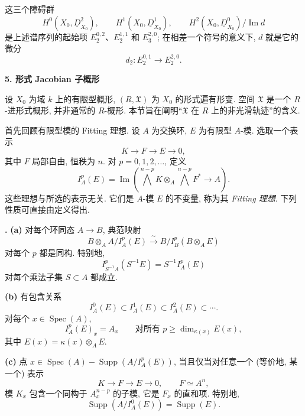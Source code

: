 
这三个障碍群
\[
H^0(X_0,\underline D^2_{X_0}),
\qquad
H^1(X_0,\underline D^1_{X_0}),
\qquad
H^2(X_0,\underline D^0_{X_0})/\operatorname{Im}d
\]
是上述谱序列的起始项 $E_2^{0,2}$、$E_2^{1,1}$ 和 $E_3^{2,0}$; 在相差一个符号的意义下, $d$ 就是它的微分
\[
d_2:E_2^{0,1}\longrightarrow E_2^{2,0}.
\]



\bigskip
\noindent\textbf{5. 形式 Jacobian 子概形}

\medskip
设 $X_0$ 为域 $k$ 上的有限型概形, $(R,\mathfrak X)$ 为 $X_0$ 的形式遍有形变. 空间 $\mathfrak X$ 是一个 $R$-进形式概形, 并非通常的 $R$-概形. 本节旨在阐明“$\mathfrak X$ 在 $R$ 上的非光滑轨迹”的含义.

首先回顾有限型模的 Fitting 理想. 设 $A$ 为交换环, $E$ 为有限型 $A$-模. 选取一个表示
\[
K\longrightarrow F\longrightarrow E\longrightarrow0,
\]
其中 $F$ 局部自由, 恒秩为 $n$. 对 $p=0,1,2,\ldots$, 定义
\[
I_A^p(E)=\operatorname{Im}\left(
 \bigwedge^{n-p}K\otimes_A\bigwedge^{n-p}F^*
 \longrightarrow A\right).
\]
这些理想与所选的表示无关. 它们是 $A$-模 $E$ 的不变量, 称为其 \emph{Fitting 理想}. 下列性质可直接由定义得出.

\medskip
\noindent\textbf{.}
\textbf{(a)} 对每个环同态 $A\longrightarrow B$, 典范映射
\[
B\otimes_A A/I_A^p(E)
\xrightarrow{\ \sim\ }
B/I_B^p(B\otimes_AE)
\]
对每个 $p$ 都是同构. 特别地,
\[
I_{S^{-1}A}^p(S^{-1}E)=S^{-1}I_A^p(E)
\]
对每个乘法子集 $S\subset A$ 都成立.


\smallskip
\noindent\textbf{(b)} 有包含关系
\[
I_A^0(E)\subset I_A^1(E)\subset I_A^2(E)\subset\cdots.
\]
对每个 $x\in\operatorname{Spec}(A)$,
\[
I_A^p(E)_x=A_x
\qquad\text{对所有 }p\geq\dim_{\kappa(x)}E(x),
\]
其中 $E(x)=\kappa(x)\otimes_AE$.

\smallskip
\noindent\textbf{(c)} 点 $x\in\operatorname{Spec}(A)-\operatorname{Supp}(A/I_A^p(E))$, 当且仅当对任意一个 (等价地, 某一个) 表示
\[
K\longrightarrow F\longrightarrow E\longrightarrow0,
\qquad F\simeq A^n,
\]
模 $K_x$ 包含一个同构于 $A_x^{n-p}$ 的子模, 它是 $F_x$ 的直和项. 特别地,
\[
\operatorname{Supp}(A/I_A^0(E))=\operatorname{Supp}(E).
\]

